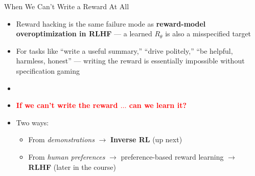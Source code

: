 \begin{frame}{When We Can't Write a Reward At All}
\begin{itemize}
    \setlength{\itemsep}{0.7em}
    \item Reward hacking is the same failure mode as \textbf{reward-model overoptimization in RLHF} --- a learned $R_\theta$ is also a misspecified target
    \item For tasks like ``write a useful summary,'' ``drive politely,'' ``be helpful, harmless, honest'' --- writing the reward is essentially impossible without specification gaming
    \item[]
    \item \textcolor{red}{\textbf{If we can't write the reward $\ldots$ can we learn it?}}
    \item Two ways:
    \begin{itemize}
        \item From \emph{demonstrations} $\longrightarrow$ \textbf{Inverse RL} (up next)
        \item From \emph{human preferences} $\longrightarrow$ preference-based reward learning $\longrightarrow$ \textbf{RLHF} (later in the course)
    \end{itemize}
\end{itemize}
\end{frame}

